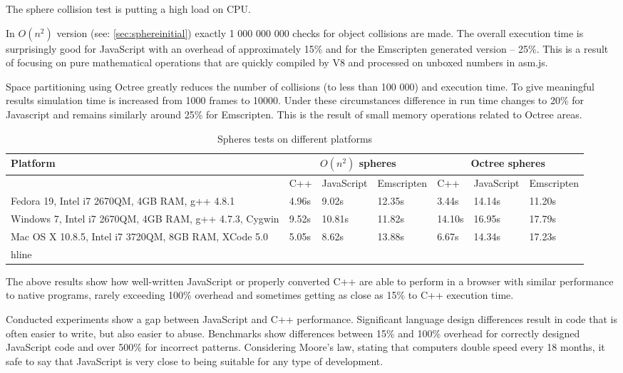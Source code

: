 The sphere collision test is putting a high load on CPU.

In $O(n^2)$ version (see: \ref{sec:sphereinitial}) exactly 1 000 000 000 checks for object collisions are made. The overall execution time is surprisingly good for JavaScript with an overhead of approximately 15\% and for the Emscripten generated version -- 25\%. This is a result of focusing on pure mathematical operations that are quickly compiled by V8 and processed on unboxed numbers in asm.js.

Space partitioning using Octree greatly reduces the number of collisions (to less than 100 000) and execution time. To give meaningful results simulation time is increased from 1000 frames to 10000. Under these circumstances difference in run time changes to 20\% for Javascript and remains similarly around 25\% for Emscripten. This is the result of small memory operations related to Octree areas.

\begin{table}[h!]
\caption{Spheres tests on different platforms}
\label{table:benchmarks}
\begin{tabular}{|p{4cm}||l|l|l||l|l|l|}
   \hline
   Platform & \multicolumn{3}{c}{$O(n^2)$ spheres} & \multicolumn{3}{c}{Octree spheres}\\ \hline
   & C++ & JavaScript & Emscripten & C++ & JavaScript & Emscripten\\ \hline
   Fedora 19, Intel i7 2670QM, 4GB RAM, g++ 4.8.1 & 4.96s & 9.02s & 12.35s & 
3.44s & 14.14s & 11.20s \\ \hline
   Windows 7, Intel i7 2670QM, 4GB RAM, g++ 4.7.3, Cygwin & 9.52s & 10.81s & 11.82s & 14.10s & 16.95s & 17.79s \\\hline
   Mac OS X 10.8.5, Intel i7 3720QM, 8GB RAM, XCode 5.0 & 5.05s & 8.62s & 13.88s & 6.67s & 14.34s & 17.23s \\hline
\end{tabular}
\end{table}

The above results show how well-written JavaScript or properly converted C++ are able to perform in a browser with similar performance to native programs, rarely exceeding 100\% overhead and sometimes getting as close as 15\% to C++ execution time.

Conducted experiments show a gap between JavaScript and C++ performance. Significant language design differences result in code that is often easier to write, but also easier to abuse. Benchmarks show differences between 15\% and 100\% overhead for correctly designed JavaScript code and over 500\% for incorrect patterns. Considering Moore's law, stating that computers double speed every 18 months, it safe to say that JavaScript is very close to being suitable for any type of development.

